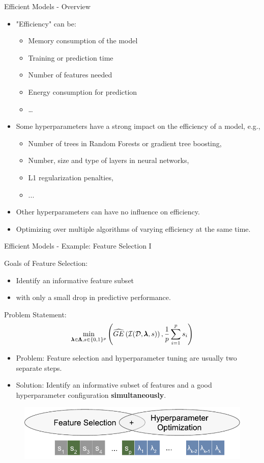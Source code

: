\begin{frame}{Efficient Models - Overview}

\begin{itemize}
  \item "Efficiency" can be:
  \begin{itemize}
    \item Memory consumption of the model
    \item Training or prediction time
    \item Number of features needed
    \item Energy consumption for prediction
    \item \ldots
  \end{itemize}
  \item Some hyperparameters have a strong impact on the efficiency of a model, e.g.,
  \begin{itemize}
    \item Number of trees in Random Forests or gradient tree boosting,
    \item Number, size and type of layers in neural networks,
    \item L1 regularization penalties,
    \item ...
  \end{itemize}
  \item Other hyperparameters can have no influence on efficiency.
  \item Optimizing over multiple algorithms of varying efficiency at the same time.
\end{itemize}

\end{frame}

\begin{frame}{Efficient Models - Example: Feature Selection I}

Goals of Feature Selection:
\begin{itemize}
  \item Identify an informative feature subset
  \item with only a small drop in predictive performance.
\end{itemize}
Problem Statement:
\[
\min_{\pmb{\lambda} \in \pmb{\Lambda}, s \in \{0,1\}^p}\left( \widehat{GE}\left(\mathcal{I}(\mathcal{D}, \pmb{\lambda}, s)\right), \frac{1}{p}\sum_{i=1}^p s_i \right)
\] 
\begin{itemize}
  \item Problem: Feature selection and hyperparameter tuning are usually two separate steps. 
  \item Solution: Identify an informative subset of features and a good hyperparameter configuration \textbf{simultaneously}.

\end{itemize}
\begin{figure}
  \centering
  \includegraphics[width = 0.5\linewidth]{images/mosmafs_presentation_p14.pdf}
\end{figure}
    
\end{frame}

